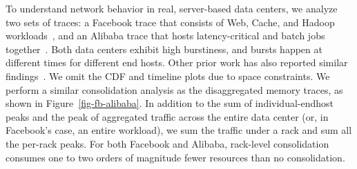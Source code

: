 %
To understand network behavior in real, server-based data centers, we analyze two sets of traces: a Facebook trace that consists of Web, Cache, and Hadoop workloads~\cite{facebook-sigcomm15}, and an Alibaba trace that hosts latency-critical and batch jobs together~\cite{alibaba-trace}. 
Both data centers exhibit high burstiness, and bursts happen at different times for different end hosts. Other prior work has also reported similar findings~\cite{netkernel-atc20,Gao16-OSDI}. We omit the CDF and timeline plots due to space constraints. 
We perform a similar consolidation analysis as the disaggregated memory traces, as shown in Figure~\ref{fig-fb-alibaba}. 
In addition to the sum of individual-endhost peaks and the peak of aggregated traffic across the entire data center (or, in Facebook's case, an entire workload),
we sum the traffic under a rack %
and sum all the per-rack peaks.
For both Facebook and Alibaba, rack-level consolidation consumes one to two orders of magnitude fewer resources than no consolidation.


